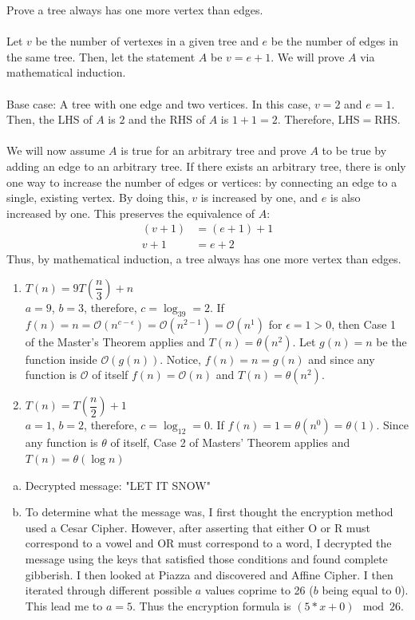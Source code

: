 \documentclass{article}
\author{Nathan Stouffer}
\begin{document}
	
Prove a tree always has one more vertex than edges. \\\\
Let $v$ be the number of vertexes in a given tree and $e$ be the number of edges in the same tree. Then, let the statement $A$ be $v=e+1$. We will prove $A$ via mathematical induction. \\\\
Base case: A tree with one edge and two vertices. In this case, $v=2$ and $e=1$. Then, the LHS of $A$ is $2$ and the RHS of $A$ is $1+1=2$. Therefore, LHS$=$RHS. \\\\
We will now assume $A$ is true for an arbitrary tree and prove $A$ to be true by adding an edge to an arbitrary tree. If there exists an arbitrary tree, there is only one way to increase the number of edges or vertices: by connecting an edge to a single, existing vertex. By doing this, $v$ is increased by one, and $e$ is also increased by one. This preserves the equivalence of $A$:
\begin{align*}
	(v+1)&=(e+1)+1 \\
	v+1&=e+2
\end{align*}
Thus, by mathematical induction, a tree always has one more vertex than edges.

\clearpage
\header

\begin{enumerate}[2.1]
	\item $T(n)=9T(\dfrac{n}{3})+n$ \\
		$a=9$, $b=3$, therefore, $c=\log_39=2$. If $f(n)=n=\mathcal{O}(n^{c-\epsilon}) =\mathcal{O}(n^{2-1}) =\mathcal{O}(n^1)$ for $\epsilon = 1>0$, then Case 1 of the Master's Theorem applies and $T(n)=\mathcal{\theta}(n^2)$. Let $g(n)=n$ be the function inside $\mathcal{O}(g(n))$. Notice, $f(n)=n=g(n)$ and since any function is $\mathcal{O}$ of itself $f(n)=\mathcal{O}(n)$ and $T(n)=\mathcal{\theta}(n^2)$.
	\item $T(n)=T(\dfrac{n}{2})+1$ \\
		$a=1$, $b=2$, therefore, $c=\log_12=0$. If $f(n)=1=\theta(n^0)=\theta(1)$. Since any function is $\theta$ of itself, Case 2 of Masters' Theorem applies and $T(n)=\theta(\log n)$
\end{enumerate}

\clearpage
\header

\begin{enumerate}[(a)]
	\item Decrypted message: "LET IT SNOW"
	\item To determine what the message was, I first thought the encryption method used a Cesar Cipher. However, after asserting that either O or R must correspond to a vowel and OR must correspond to a word, I decrypted the message using the keys that satisfied those conditions and found complete gibberish. I then looked at Piazza and discovered and Affine Cipher. I then iterated through different possible $a$ values coprime to 26 ($b$ being equal to $0$). This lead me to $a=5$. Thus the encryption formula is $(5*x + 0) \mod 26$.
\end{enumerate}
\end{document}
